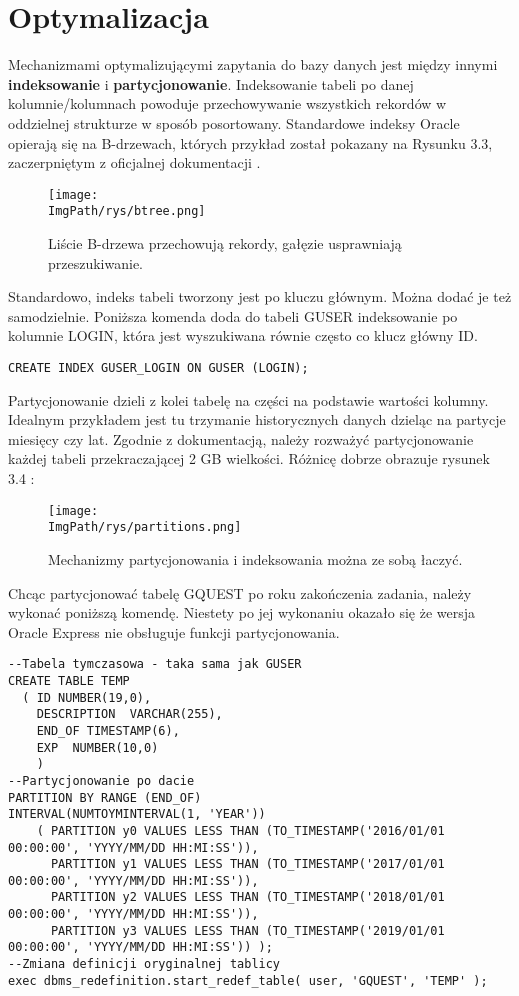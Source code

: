 \documentclass[a4paper,12pt,twoside,openany]{report}
\newcommand{\ImgPath}{.}
\begin{document}
\section{Optymalizacja}
Mechanizmami optymalizującymi zapytania do bazy danych jest między innymi \textbf{indeksowanie} i \textbf{partycjonowanie}. Indeksowanie tabeli po danej kolumnie/kolumnach powoduje przechowywanie wszystkich rekordów w oddzielnej strukturze w sposób posortowany. Standardowe indeksy Oracle opierają się na B-drzewach, których przykład został pokazany na Rysunku 3.3, zaczerpniętym z oficjalnej dokumentacji \cite{Oracle2}.
				\begin{figure}[!htbp]
					\begin{center}
						\centering
						\texttt{[image: \\ImgPath/rys/btree.png]}
					\end{center}
					\caption{Liście B-drzewa przechowują rekordy, gałęzie usprawniają przeszukiwanie.}
					\label{UMLTS}
				\end{figure}
Standardowo, indeks tabeli tworzony jest po kluczu głównym. Można dodać je też samodzielnie. Poniższa komenda doda do tabeli GUSER indeksowanie po kolumnie LOGIN, która jest wyszukiwana równie często co klucz główny ID.
\begin{lstlisting}
CREATE INDEX GUSER_LOGIN ON GUSER (LOGIN);
\end{lstlisting}
Partycjonowanie dzieli z kolei tabelę na części na podstawie wartości kolumny. Idealnym przykładem jest tu trzymanie historycznych danych  dzieląc na partycje miesięcy czy lat. Zgodnie z dokumentacją, należy rozważyć partycjonowanie każdej tabeli przekraczającej 2 GB wielkości. Różnicę dobrze obrazuje rysunek 3.4 \cite{Oracle2}:
				\begin{figure}[!htbp]
					\begin{center}
						\centering
						\texttt{[image: \\ImgPath/rys/partitions.png]}
					\end{center}
					\caption{Mechanizmy partycjonowania i indeksowania można ze sobą łaczyć.}
					\label{UMLTS}
				\end{figure}
Chcąc partycjonować tabelę GQUEST po roku zakończenia zadania, należy wykonać poniższą komendę. Niestety po jej wykonaniu okazało się że wersja Oracle Express nie obsługuje funkcji partycjonowania.
\begin{lstlisting}
--Tabela tymczasowa - taka sama jak GUSER
CREATE TABLE TEMP
  ( ID NUMBER(19,0),
    DESCRIPTION  VARCHAR(255),
    END_OF TIMESTAMP(6),
    EXP  NUMBER(10,0)
    )
--Partycjonowanie po dacie
PARTITION BY RANGE (END_OF) 
INTERVAL(NUMTOYMINTERVAL(1, 'YEAR'))
    ( PARTITION y0 VALUES LESS THAN (TO_TIMESTAMP('2016/01/01 00:00:00', 'YYYY/MM/DD HH:MI:SS')),
      PARTITION y1 VALUES LESS THAN (TO_TIMESTAMP('2017/01/01 00:00:00', 'YYYY/MM/DD HH:MI:SS')),
      PARTITION y2 VALUES LESS THAN (TO_TIMESTAMP('2018/01/01 00:00:00', 'YYYY/MM/DD HH:MI:SS')),
      PARTITION y3 VALUES LESS THAN (TO_TIMESTAMP('2019/01/01 00:00:00', 'YYYY/MM/DD HH:MI:SS')) );
--Zmiana definicji oryginalnej tablicy    
exec dbms_redefinition.start_redef_table( user, 'GQUEST', 'TEMP' );
\end{lstlisting}
\end{document}
